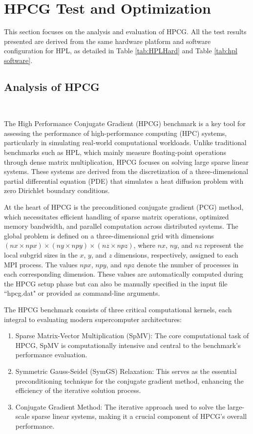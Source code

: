 \section{HPCG Test and Optimization}
This section focuses on the analysis and evaluation of HPCG. 
All the test results presented  are derived from the same hardware platform and software configuration for HPL, as detailed in Table \ref{tab:HPLHard} and Table \ref{tab:hpl software}.

\subsection{Analysis of HPCG}
\ 

The High Performance Conjugate Gradient (HPCG) benchmark is a key tool for assessing the performance of high-performance computing (HPC) systems, particularly in simulating real-world
computational workloads.
Unlike traditional benchmarks such as HPL, which mainly measure
floating-point operations through dense matrix multiplication, HPCG focuses on solving large sparse linear systems. 
These systems are derived from the discretization of a three-dimensional partial differential equation (PDE) that simulates a heat diffusion problem with zero Dirichlet boundary conditions.

At the heart of HPCG is the preconditioned conjugate gradient (PCG) method, which necessitates efficient handling of sparse matrix operations, optimized memory bandwidth, and parallel
computation across distributed systems. 
The global problem is defined on a three-dimensional grid
with dimensions $ (nx \times npx) \times (ny \times npy) \times (nz \times npz) $, where $nx$, $ny$, and $nz$ represent the local subgrid sizes in the $x$, $y$, and $z$ dimensions, respectively, assigned to each MPI process. 
The values $npx$, $npy$, and $npz$ denote the number of processes in each corresponding dimension. 
These values are automatically computed during the HPCG setup phase but can also be manually specified in the input file ``hpcg.dat" or provided as command-line arguments.

The HPCG benchmark consists of three critical computational kernels, each integral to evaluating modern supercomputer architectures:
\begin{enumerate}
    \item Sparse Matrix-Vector Multiplication (SpMV): The core computational task of HPCG, SpMV is computationally intensive and central to the benchmark’s performance evaluation.
    \item Symmetric Gauss-Seidel (SymGS) Relaxation: This serves as the essential preconditioning technique for the conjugate gradient method, enhancing the efficiency of the iterative solution process.
    \item  Conjugate Gradient Method: The iterative approach used to solve the large-scale sparse linear systems, making it a crucial component of HPCG’s overall performance.   
\end{enumerate}

